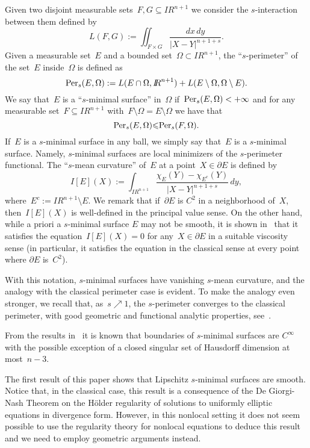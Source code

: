 \documentclass[11pt]{amsart}
\begin{document}
Given two disjoint measurable sets~$F,G\subseteq{{I\!\!R}}^{n+1}$ we consider the $s$-interaction
between them defined by
$$ L(F,G):=\iint_{F\times G}\frac{dx\,dy}{|X-Y|^{n+1+s}}.$$
Given a measurable set~$E$ and a bounded set~$\Omega\subset{{I\!\!R}}^{n+1}$,
the ``$s$-perimeter'' of the set~$E$ inside~$\Omega$ is defined as
$$ {\rm Per}_s(E,\Omega):= L(E\cap\Omega,{{I\!\!R}}^{n+1})+L(E\setminus\Omega,\Omega\setminus E).$$
We say that~$E$ is a ``$s$-minimal surface'' in~$\Omega$ if~${\rm Per}_s(E,\Omega)<+\infty$
and for any measurable set~$F\subseteq{{I\!\!R}}^{n+1}$ with~$F\setminus\Omega=E\setminus\Omega$
we have that
$$ {\rm Per}_s(E,\Omega){\leqslant} {\rm Per}_s(F,\Omega).$$
If~$E$ is a $s$-minimal surface in any ball, we simply say that~$E$ is
a $s$-minimal surface.
Namely, $s$-minimal surfaces are local minimizers of the $s$-perimeter functional.
The ``$s$-mean curvature'' of~$E$ at a point~$X\in\partial E$ is defined by
\begin{equation}\label{DE}
I[E](X):=\int_{{{I\!\!R}}^{n+1}}\frac{\chi_E(Y)-\chi_{E^c}(Y)}{|X-Y|^{n+1+s}}\,dy,\end{equation}
where~$E^c:={{I\!\!R}}^{n+1}\setminus E$. We remark that if~$\partial E$ is $C^2$ in a neighborhood of~$X$,
then~$I[E](X)$ is well-defined in the principal value sense. On the other hand, 
while a priori 
a $s$-minimal surface $E$ may not be smooth, it is shown in~\cite{CRS} that it satisfies the equation~$I[E](X)=0$ for any~$X\in \partial E$ in a suitable viscosity sense (in particular, it satisfies
the equation in the classical sense at every point where $\partial E$ is~$C^2$).

With this notation, $s$-minimal surfaces have vanishing $s$-mean curvature, and the analogy
with the classical perimeter case is evident.
To make the analogy even stronger, we recall that, as~$s\nearrow1$, the $s$-perimeter
converges to the classical perimeter, with good geometric and functional analytic
properties, see~\cite{CV, ADM}.

{F}rom the results in~\cite{CRS, SV, BFV} it is known that boundaries of $s$-minimal
surfaces are $C^\infty$ with the possible
exception of a closed singular set of
Hausdorff dimension at most~$n-3$.

The first result of this paper shows that
Lipschitz $s$-minimal surfaces are smooth.
Notice that, in the classical case, this result is a consequence of the De Giorgi-Nash Theorem
on the H\"older regularity of solutions to uniformly elliptic equations in divergence form.
However, in this nonlocal setting it does not seem possible
to use the regularity theory
for nonlocal equations to deduce this result and
we need to employ geometric arguments instead.
\end{document}
